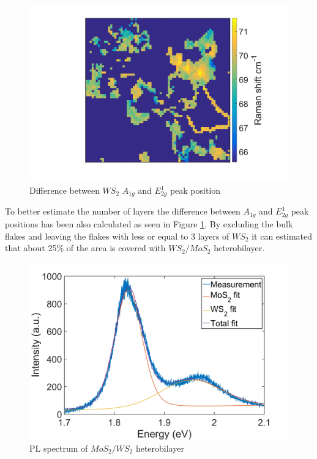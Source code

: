\begin{figure}[H]
	\begin{center}
		\includegraphics[scale=0.3]{Heterostructures/HeterostructureRamanDifferenceW.png}
		\caption{Difference between $WS_2$ $A_{1g}$ and $E^1_{2g}$ peak position}
		\label{fig:HeterostructuresRamanDifferenceW}
	\end{center}
\end{figure}

To better estimate the number of layers the difference between $A_{1g}$ and $E^1_{2g}$ peak positions has been also calculated as seen in Figure \ref{fig:HeterostructuresRamanDifferenceW}. By excluding the bulk flakes and leaving the flakes with less or equal to 3 layers of $WS_2$ it can estimated that about 25\% of the area is covered with $WS_2/MoS_2$ heterobilayer.

\begin{figure}[H]
	\begin{center}
		\includegraphics[scale=0.3]{Heterostructures/HeterostructurePLSpectrumFitted.png}
		\caption{PL spectrum of $MoS_2/WS_2$ heterobilayer}
		\label{fig:HeterostructuresPLSpectrumFitted}
	\end{center}
\end{figure}

